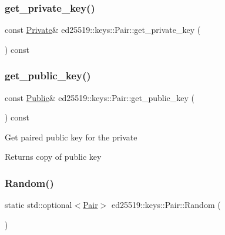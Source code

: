 \subsubsection{\texorpdfstring{get\_private\_key()}{get\_private\_key()}}
{\footnotesize\ttfamily const \mbox{\hyperlink{classed25519_1_1keys_1_1_private}{Private}}\& ed25519\+::keys\+::\+Pair\+::get\+\_\+private\+\_\+key (\begin{DoxyParamCaption}{ }\end{DoxyParamCaption}) const\hspace{0.3cm}{\ttfamily [inline]}}

\mbox{\label{classed25519_1_1keys_1_1_pair_aad6c01fdb3b75ce2b05e51dbc833ac72}} 
\subsubsection{\texorpdfstring{get\_public\_key()}{get\_public\_key()}}
{\footnotesize\ttfamily const \mbox{\hyperlink{classed25519_1_1keys_1_1_public}{Public}}\& ed25519\+::keys\+::\+Pair\+::get\+\_\+public\+\_\+key (\begin{DoxyParamCaption}{ }\end{DoxyParamCaption}) const\hspace{0.3cm}{\ttfamily [inline]}}

Get paired public key for the private \begin{DoxyReturn}{Returns}
copy of public key 
\end{DoxyReturn}
\mbox{\label{classed25519_1_1keys_1_1_pair_a56deb8f1bf6d1a51313abebd5a41d6fc}} 
\subsubsection{\texorpdfstring{Random()}{Random()}}
{\footnotesize\ttfamily static std\+::optional$<$\mbox{\hyperlink{classed25519_1_1keys_1_1_pair}{Pair}}$>$ ed25519\+::keys\+::\+Pair\+::\+Random (\begin{DoxyParamCaption}{ }\end{DoxyParamCaption})\hspace{0.3cm}{\ttfamily [static]}}

